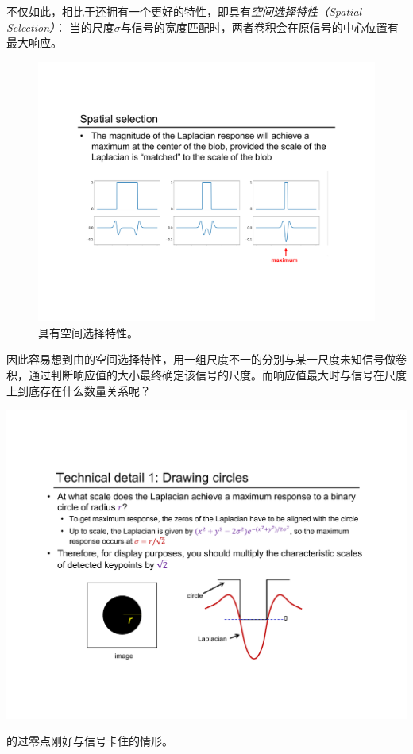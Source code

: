 不仅如此，\lpl 相比于\gspd 还拥有一个更好的特性，即具有\emph{空间选择特性（Spatial Selection）}：%
当\lpl 的尺度$\sigma$与信号的宽度匹配时，两者卷积会在原信号的中心位置有最大响应。

\begin{figure}[H]
	\centering
	\includegraphics[width=.9\textwidth]{fig/spatial selection.pdf}
	\caption{\lpl 具有空间选择特性。}
\end{figure}

因此容易想到由\lpl 的空间选择特性，用一组尺度不一的\lpl 分别与某一尺度未知信号做卷积，通过判断响应值的大小最终确定该信号的尺度。而响应值最大时\lpl 与信号在尺度上到底存在什么数量关系呢？

\begin{marginfigure}
	\centering
	\includegraphics[width=\textwidth]{fig/LoG zero crossings-2.pdf}
	\caption{\lpl 的过零点刚好与信号卡住的情形。}
\end{marginfigure}

